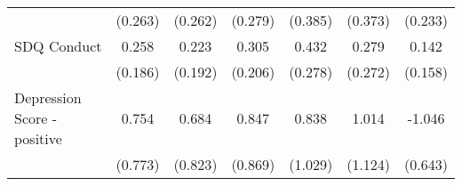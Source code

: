 {\begin{tabular}{l*{6}{c}}
            &     (0.263)         &     (0.262)         &     (0.279)         &     (0.385)         &     (0.373)         &     (0.233)         \\
\addlinespace
SDQ Conduct &       0.258         &       0.223         &       0.305         &       0.432         &       0.279         &       0.142         \\
            &     (0.186)         &     (0.192)         &     (0.206)         &     (0.278)         &     (0.272)         &     (0.158)         \\
\addlinespace
Depression Score - positive&       0.754         &       0.684         &       0.847         &       0.838         &       1.014         &      -1.046         \\
            &     (0.773)         &     (0.823)         &     (0.869)         &     (1.029)         &     (1.124)         &     (0.643)         \\
\bottomrule
\end{tabular}
}
